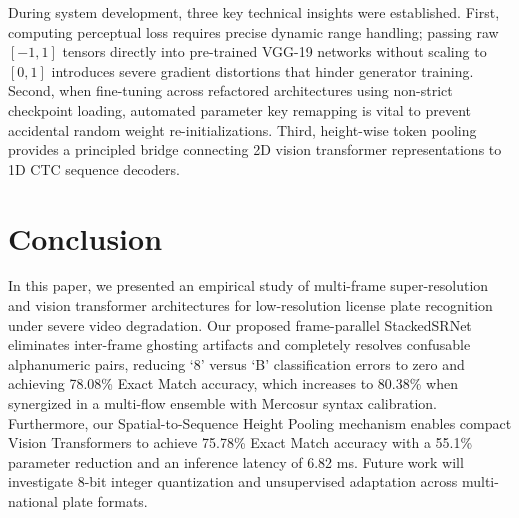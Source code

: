 \documentclass[sigconf]{acmart}
\begin{document}
During system development, three key technical insights were established. First, computing perceptual loss requires precise dynamic range handling; passing raw $[-1, 1]$ tensors directly into pre-trained VGG-19 networks without scaling to $[0, 1]$ introduces severe gradient distortions that hinder generator training. Second, when fine-tuning across refactored architectures using non-strict checkpoint loading, automated parameter key remapping is vital to prevent accidental random weight re-initializations. Third, height-wise token pooling provides a principled bridge connecting 2D vision transformer representations to 1D CTC sequence decoders.

\section{Conclusion}
\label{sec:conclusion}

In this paper, we presented an empirical study of multi-frame super-resolution and vision transformer architectures for low-resolution license plate recognition under severe video degradation. Our proposed frame-parallel StackedSRNet eliminates inter-frame ghosting artifacts and completely resolves confusable alphanumeric pairs, reducing `8' versus `B' classification errors to zero and achieving 78.08\% Exact Match accuracy, which increases to 80.38\% when synergized in a multi-flow ensemble with Mercosur syntax calibration. Furthermore, our Spatial-to-Sequence Height Pooling mechanism enables compact Vision Transformers to achieve 75.78\% Exact Match accuracy with a 55.1\% parameter reduction and an inference latency of 6.82 ms. Future work will investigate 8-bit integer quantization and unsupervised adaptation across multi-national plate formats.



\end{document}
